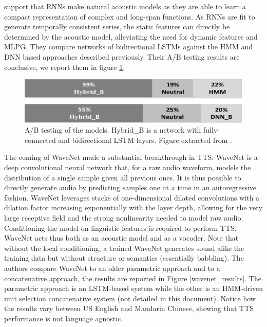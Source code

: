 \documentclass[a4paper, oneside, 12pt, english]{article}
\begin{document}
\citep{BDLSTMTTS} support that RNNs make natural acoustic models as they are able to learn a compact representation of complex and long-span functions. As RNNs are fit to generate temporally consistent series, the static features can directly be determined by the acoustic model, alleviating the need for dynamic features and MLPG. They compare networks of bidirectional LSTMs against the HMM and DNN based approaches described previously. Their A/B testing results are conclusive, we report them in figure \ref{dblstm_subjective}.

\begin{figure}[h]
	\centering
	\includegraphics[width=0.6\linewidth]{images/bdlstm_subjective.png}
	\caption{A/B testing of the models. Hybrid\_B is a network with fully-connected and bidirectional LSTM layers. Figure extracted from \citep{BDLSTMTTS}.}
	\label{dblstm_subjective}
\end{figure}

The coming of WaveNet \citep{WaveNet} made a substantial breakthrough in TTS. WaveNet is a deep convolutional neural network that, for a raw audio waveform, models the distribution of a single sample given all previous ones. It is thus possible to directly generate audio by predicting samples one at a time in an autoregressive fashion. WaveNet leverages stacks of one-dimensional dilated convolutions with a dilation factor increasing exponentially with the layer depth, allowing for the very large receptive field and the strong nonlinearity needed to model raw audio. Conditioning the model on linguistic features is required to perform TTS. WaveNet acts thus both as an acoustic model and as a vocoder. Note that without the local conditioning, a trained WaveNet generates sound alike the training data but without structure or semantics (essentially babbling). 
The authors compare WaveNet to an older parametric approach and to a concatenative approach, the results are reported in Figure \ref{wavenet_results}. The parametric approach is an LSTM-based system while the other is an HMM-driven unit selection concatenative system (not detailed in this document). Notice how the results vary between US English and Mandarin Chinese, showing that TTS performance is not language agnostic.
\end{document}
